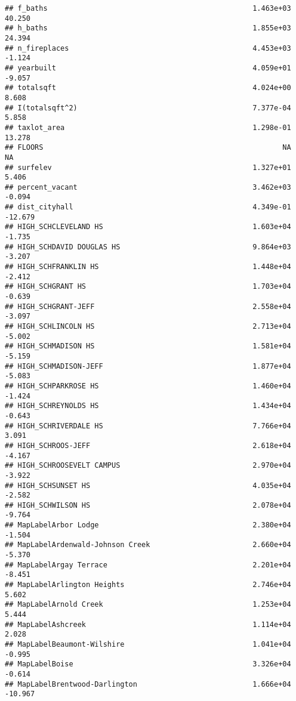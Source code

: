 \documentclass[]{article}
\begin{document}
\begin{verbatim}
## f_baths                                                1.463e+03  40.250
## h_baths                                                1.855e+03  24.394
## n_fireplaces                                           4.453e+03  -1.124
## yearbuilt                                              4.059e+01  -9.057
## totalsqft                                              4.024e+00   8.608
## I(totalsqft^2)                                         7.377e-04   5.858
## taxlot_area                                            1.298e-01  13.278
## FLOORS                                                        NA      NA
## surfelev                                               1.327e+01   5.406
## percent_vacant                                         3.462e+03  -0.094
## dist_cityhall                                          4.349e-01 -12.679
## HIGH_SCHCLEVELAND HS                                   1.603e+04  -1.735
## HIGH_SCHDAVID DOUGLAS HS                               9.864e+03  -3.207
## HIGH_SCHFRANKLIN HS                                    1.448e+04  -2.412
## HIGH_SCHGRANT HS                                       1.703e+04  -0.639
## HIGH_SCHGRANT-JEFF                                     2.558e+04  -3.097
## HIGH_SCHLINCOLN HS                                     2.713e+04  -5.002
## HIGH_SCHMADISON HS                                     1.581e+04  -5.159
## HIGH_SCHMADISON-JEFF                                   1.877e+04  -5.083
## HIGH_SCHPARKROSE HS                                    1.460e+04  -1.424
## HIGH_SCHREYNOLDS HS                                    1.434e+04  -0.643
## HIGH_SCHRIVERDALE HS                                   7.766e+04   3.091
## HIGH_SCHROOS-JEFF                                      2.618e+04  -4.167
## HIGH_SCHROOSEVELT CAMPUS                               2.970e+04  -3.922
## HIGH_SCHSUNSET HS                                      4.035e+04  -2.582
## HIGH_SCHWILSON HS                                      2.078e+04  -9.764
## MapLabelArbor Lodge                                    2.380e+04  -1.504
## MapLabelArdenwald-Johnson Creek                        2.660e+04  -5.370
## MapLabelArgay Terrace                                  2.201e+04  -8.451
## MapLabelArlington Heights                              2.746e+04   5.602
## MapLabelArnold Creek                                   1.253e+04   5.444
## MapLabelAshcreek                                       1.114e+04   2.028
## MapLabelBeaumont-Wilshire                              1.041e+04  -0.995
## MapLabelBoise                                          3.326e+04  -0.614
## MapLabelBrentwood-Darlington                           1.666e+04 -10.967

\end{verbatim}
\end{document}
